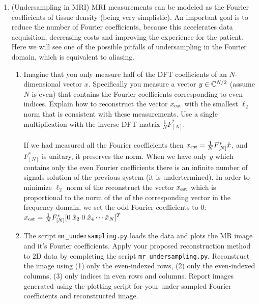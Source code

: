 \documentclass[12pt,twoside]{article}
\begin{document}
\begin{enumerate}
  \newpage
  \item (Undersampling in MRI) MRI measurements can be modeled as the Fourier coefficients of tissue density (being very simplistic). An important goal is to reduce the number of Fourier coefficients, because this accelerates data acquisition, decreasing costs and improving the experience for the patient. Here we will see one of the possible pitfalls of undersampling in the Fourier domain, which is equivalent to aliasing.
 \begin{enumerate}
 \item Imagine that you only measure half of the DFT coefficients of an $N$-dimensional vector $x$.  Specifically you measure a vector $y \in \mathbb{C}^{N/2}$ (assume $N$ is even) that contains the Fourier coefficients corresponding to even indices. Explain how to reconstruct the vector $x_{\operatorname{est}}$ with the smallest $\ell_2$ norm that is consistent with these measurements. Use a single multiplication with the inverse DFT matrix $\frac{1}{N}F_{[N]}^{\ast}$.\\ \\
 If we had measured all the  Fourier coefficients then $x_{\operatorname{est}} = \frac{1}{N}F_{[N]}^{\ast} \hat{x}$, and $F_{[N]}^{\ast}$ is unitary, it preserves the norm. When  we have only $y$ which contains only the even Fourier coefficients there is an infinite number of signals solution of the previous system (it is undertermined). In order to minimize  $\ell_2$ norm of the reconstruct the vector $x_{\operatorname{est}}$ which is proportional to the norm of the of the corresponding vector in the frequency domain, we set the odd Fourier coefficients to $0$: $x_{\operatorname{est}} = \frac{1}{N}F_{[N]}^{\ast} [0 \; \hat{x}_2 \;0 \; \hat{x}_4 \cdots \hat{x}_N]^T$
 
 \item The script  \texttt{mr\_undersampling.py} loads the data and plots the MR image and it's Fourier coefficients. Apply your proposed reconstruction method to 2D data by completing the script \texttt{mr\_undersampling.py}.  Reconstruct the image using (1) only the even-indexed rows, (2) only the even-indexed columns, (3) only indices in even rows and columns. Report images generated using the plotting script for your under sampled Fourier coefficients and reconstructed image.  


\end{enumerate}
\end{enumerate}
\end{document}
